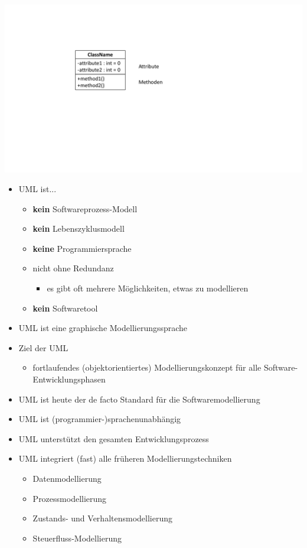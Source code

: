 \begin{multicols}{2}
\begin{minipage}{\linewidth}
	\includegraphics[width=\linewidth]{images/klasse3.pdf}
\end{minipage}
\begin{itemize}
	\item UML ist...
	\begin{itemize}
		\item \textbf{kein} Softwareprozess-Modell
		\item \textbf{kein} Lebenszyklusmodell
		\item \textbf{keine} Programmiersprache
		\item nicht ohne Redundanz
		\begin{itemize}
			\item es gibt oft mehrere Möglichkeiten, etwas zu modellieren
		\end{itemize}
		\item \textbf{kein} Softwaretool
	\end{itemize}
\end{itemize}
\vfill\null
\columnbreak
\begin{itemize}
	\item UML ist eine graphische Modellierungssprache
	\item Ziel der UML
	\begin{itemize}
		\item fortlaufendes (objektorientiertes) Modellierungskonzept für alle Software-Entwicklungsphasen
	\end{itemize}
	\item UML ist heute der de facto Standard für die Softwaremodellierung
	\item UML ist (programmier-)sprachenunabhängig
	\item UML unterstützt den gesamten Entwicklungsprozess
	\item UML integriert (fast) alle früheren Modellierungstechniken
	\begin{itemize}
		\item Datenmodellierung
		\item Prozessmodellierung
		\item Zustands- und Verhaltensmodellierung
		\item Steuerfluss-Modellierung
	\end{itemize}
\end{itemize}
\end{multicols}

